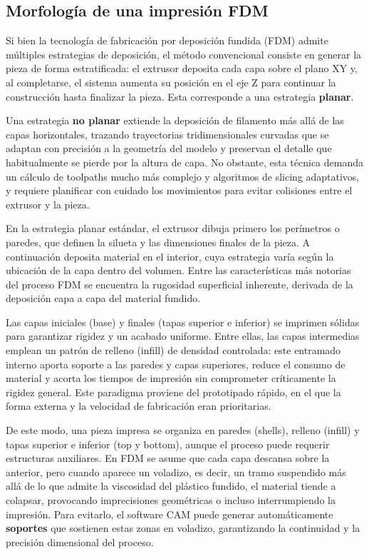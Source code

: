 \subsection{Morfología de una impresión FDM}

Si bien la tecnología de fabricación por deposición fundida (FDM) admite múltiples estrategias de deposición, el método convencional consiste en generar la pieza de forma estratificada: el extrusor deposita cada capa sobre el plano XY y, al completarse, el sistema aumenta su posición en el eje Z para continuar la construcción hasta finalizar la pieza. Esta corresponde a una estrategia \textbf{planar}.

Una estrategia \textbf{no planar} extiende la deposición de filamento más allá de las capas horizontales, trazando trayectorias tridimensionales curvadas que se adaptan con precisión a la geometría del modelo y preservan el detalle que habitualmente se pierde por la altura de capa. No obstante, esta técnica demanda un cálculo de toolpaths mucho más complejo y algoritmos de slicing adaptativos, y requiere planificar con cuidado los movimientos para evitar colisiones entre el extrusor y la pieza.

En la estrategia planar estándar, el extrusor dibuja primero los perímetros o paredes, que definen la silueta y las dimensiones finales de la pieza. A continuación deposita material en el interior, cuya estrategia varía según la ubicación de la capa dentro del volumen. Entre las características más notorias del proceso FDM se encuentra la rugosidad superficial inherente, derivada de la deposición capa a capa del material fundido.

Las capas iniciales (base) y finales (tapas superior e inferior) se imprimen sólidas para garantizar rigidez y un acabado uniforme. Entre ellas, las capas intermedias emplean un patrón de relleno (infill) de densidad controlada: este entramado interno aporta soporte a las paredes y capas superiores, reduce el consumo de material y acorta los tiempos de impresión sin comprometer críticamente la rigidez general. Este paradigma proviene del prototipado rápido, en el que la forma externa y la velocidad de fabricación eran prioritarias.

De este modo, una pieza impresa se organiza en paredes (shells), relleno (infill) y tapas superior e inferior (top y bottom), aunque el proceso puede requerir estructuras auxiliares. En FDM se asume que cada capa descansa sobre la anterior, pero cuando aparece un voladizo, es decir, un tramo suspendido más allá de lo que admite la viscosidad del plástico fundido, el material tiende a colapsar, provocando imprecisiones geométricas o incluso interrumpiendo la impresión. Para evitarlo, el software CAM puede generar automáticamente \textbf{soportes} que sostienen estas zonas en voladizo, garantizando la continuidad y la precisión dimensional del proceso.

